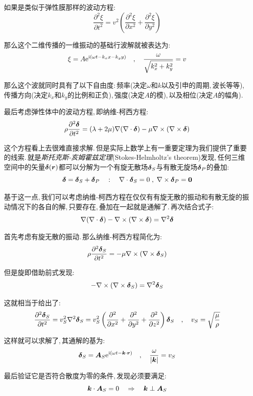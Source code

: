\vspace{0.5cm}

如果是类似于弹性膜那样的波动方程:
\[\frac{\partial^2 \xi}{\partial t^2}=v^2\left(\frac{\partial^2 \xi}{\partial x^2}+\frac{\partial^2 \xi}{\partial y^2}\right)\]

那么这个二维传播的一维振动的基础行波解就被表达为:
\[\xi=A{\rm e}^{{\rm i}(\omega t- k_x x-k_y y)}\quad,\quad \frac{\omega}{\sqrt{k_x^2+k_y^2}}=v\]

那么这个波就同时具有了以下自由度:\,频率(决定$\omega$和$k$以及引申的周期,\,波长等等),\,传播方向(决定$k_x$和$k_y$的比例和正负),\,强度(决定$A$的模),\,以及相位(决定$A$的幅角).

\vspace{0.5cm}

最后考虑弹性体中的波动方程,\,即纳维-柯西方程:
\[\rho\frac{\partial^2 \boldsymbol{\delta}}{\partial t^2}=(\lambda+2\mu)\nabla(\nabla\cdot \boldsymbol{\delta})-\mu\nabla\times(\nabla\times\boldsymbol{\delta})\]

这个方程看上去很难直接求解.\,但是实际上数学上有一重要定理为我们提供了重要的线索.\,就是\emph{斯托克斯-亥姆霍兹定理}(Stokes-Helmholtz's theorem)发现,\,任何三维空间中的矢量$\boldsymbol{\delta}(\boldsymbol{r})$都可以分解为一个有旋无散场$\boldsymbol{\delta}_S$与有散无旋场$\boldsymbol{\delta}_P$的叠加:
\[\boldsymbol{\delta}=\boldsymbol{\delta}_S+\boldsymbol{\delta}_P\quad :\quad \nabla\cdot \boldsymbol{\delta}_S=0\;,\;\nabla \times \boldsymbol{\delta}_P=\boldsymbol{0}\]

基于这一点,\,我们可以考虑纳维-柯西方程在仅仅有有旋无散的振动和有散无旋的振动情况下的各自的解,\,只要存在,\,叠加在一起就是通解了.\,再次结合式子:
\[\nabla(\nabla\cdot \boldsymbol{\delta})-\nabla\times(\nabla\times\boldsymbol{\delta})=\nabla^2\boldsymbol{\delta}\]

首先考虑有旋无散的振动.\,那么纳维-柯西方程简化为:
\[\rho\frac{\partial^2 \boldsymbol{\delta}_S}{\partial t^2}=-\mu\nabla\times(\nabla\times\boldsymbol{\delta}_S)\]

但是旋即借助前式发现:
\[-\nabla\times(\nabla\times\boldsymbol{\delta}_S)=\nabla^2\boldsymbol{\delta}_S\]

这就相当于给出了:
\[\frac{\partial^2 \boldsymbol{\delta}_S}{\partial t^2}=v_S^2\nabla^2\boldsymbol{\delta}_S=v_S^2\left(\frac{\partial^2 }{\partial x^2}+\frac{\partial^2 }{\partial y^2}+\frac{\partial^2 }{\partial z^2}\right)\boldsymbol{\delta}_S\quad ,\quad v_S=\sqrt{\frac{\mu}{\rho}}\]

这样就可以求解了,\,其通解的基为:
\[\boldsymbol{\delta}_S=\boldsymbol{A}_S{\rm e}^{{\rm i}(\omega t- \boldsymbol{k}\cdot\boldsymbol{r})}\quad,\quad \frac{\omega}{|\boldsymbol{k}|}=v_S\]

最后验证它是否符合散度为零的条件,\,发现必须要满足:
\[\boldsymbol{k}\cdot\boldsymbol{A}_S=0\quad\Rightarrow\quad \boldsymbol{k}\perp\boldsymbol{A}_S\]

